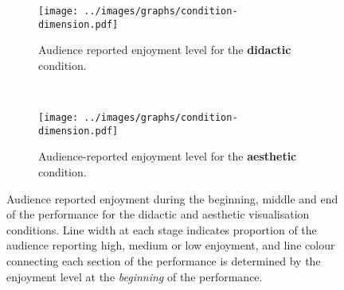 \begin{figure}
\centering
\begin{subfigure}{\textwidth}
  \centering
  \texttt{[image: ../images/graphs/condition-dimension.pdf]}
  \caption[Didactic condition enjoyment detailed survey results]{Audience reported enjoyment level for the \textbf{didactic} condition.}
  \label{fig:didactic-enjoyment}
\end{subfigure}\\
\begin{subfigure}{\textwidth}
  \centering
  \texttt{[image: ../images/graphs/condition-dimension.pdf]}
  \caption[Aesthetic condition enjoyment detailed survey results]{Audience-reported enjoyment level for the \textbf{aesthetic} condition.}
  \label{fig:aesthetic-enjoyment}
\end{subfigure}

\caption[User study enjoyment survey responses]{Audience reported enjoyment during the beginning, middle and end of the performance for the didactic and aesthetic visualisation conditions. Line width at each stage indicates proportion of the audience reporting high, medium or low enjoyment, and line colour connecting each section of the performance is determined by the enjoyment level at the \emph{beginning} of the performance.}
\label{fig:user-study-condition-enjoyment}
\end{figure}